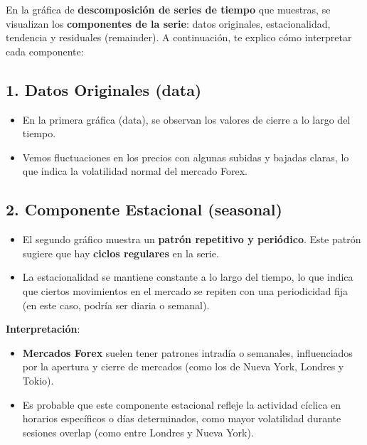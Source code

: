 \documentclass[
]{book}
\begin{document}
En la gráfica de \textbf{descomposición de series de tiempo} que muestras, se visualizan los \textbf{componentes de la serie}: datos originales, estacionalidad, tendencia y residuales (remainder). A continuación, te explico cómo interpretar cada componente:

\subsection{\texorpdfstring{1. \textbf{Datos Originales (data)}}{1. Datos Originales (data)}}\label{datos-originales-data}

\begin{itemize}
\item
  En la primera gráfica (data), se observan los valores de cierre a lo largo del tiempo.
\item
  Vemos fluctuaciones en los precios con algunas subidas y bajadas claras, lo que indica la volatilidad normal del mercado Forex.
\end{itemize}

\subsection{\texorpdfstring{2. \textbf{Componente Estacional (seasonal)}}{2. Componente Estacional (seasonal)}}\label{componente-estacional-seasonal}

\begin{itemize}
\item
  El segundo gráfico muestra un \textbf{patrón repetitivo y periódico}. Este patrón sugiere que hay \textbf{ciclos regulares} en la serie.
\item
  La estacionalidad se mantiene constante a lo largo del tiempo, lo que indica que ciertos movimientos en el mercado se repiten con una periodicidad fija (en este caso, podría ser diaria o semanal).
\end{itemize}

\textbf{Interpretación}:

\begin{itemize}
\item
  \textbf{Mercados Forex} suelen tener patrones intradía o semanales, influenciados por la apertura y cierre de mercados (como los de Nueva York, Londres y Tokio).
\item
  Es probable que este componente estacional refleje la actividad cíclica en horarios específicos o días determinados, como mayor volatilidad durante sesiones overlap (como entre Londres y Nueva York).
\end{itemize}
\end{document}
